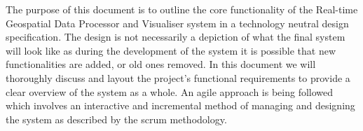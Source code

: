 The purpose of this document is to outline the core functionality of the Real-time Geospatial Data Processor and Visualiser system in a technology neutral design specification. The design is not necessarily a depiction of what the final system will look like as during the development of the system it is possible that new functionalities are added, or old ones removed. \linebreak \linebreak
In this document we will thoroughly discuss and layout the project's functional requirements to provide a clear overview of the system as a whole. An agile approach is being followed which
involves an interactive and incremental method of managing and designing the system as described by the scrum methodology.